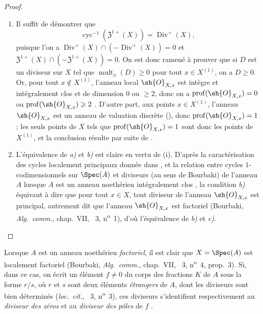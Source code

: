 \begin{proof}
\begin{enumerate}[label=(\roman*)]
  \item Il suffit de démontrer que
\[
\label{IV.21.6.9.1}
  \operatorname{cyc}^{-1}(\mathfrak{Z}^{1+}(X))=\operatorname{Div}^+(X),
  \tag{21.6.9.1}
\]
puisque l'on a $\operatorname{Div}^+(X)\cap(-\operatorname{Div}^+(X))=0$ et $\mathfrak{Z}^{1+}(X)\cap(-\mathfrak{Z}^{1+}(X))=0$.
On est donc ramené à prouver que si $D$ est un diviseur sur $X$ tel que $\operatorname{mult}_x(D)\geq0$ pour tout $x\in X^{(1)}$, on a $D\geq0$.
Or, pour tout $x\notin X^{(1)}$, l'anneau local $\sh{O}_{X,x}$ est intègre et intégralement clos et
de dimension $0$ ou $\geq2$, donc on a $\operatorname{prof}(\sh{O}_{X,x})=0$ ou $\operatorname{prof}(\sh{O}_{X,x})\geq2$ .
D'autre part, aux points $x\in X^{(1)}$, l'anneau $\sh{O}_{X,x}$ est un anneau de valuation discrète (), donc $\operatorname{prof}(\sh{O}_{X,x})=1$ ;
les seuls points de $X$ tels que $\operatorname{prof}(\sh{O}_{X,x})=1$ sont donc les points de $X^{(1)}$, et la conclusion résulte par suite de .

  \item L'équivalence de \emph{a)} et \emph{b)} est claire en vertu de (i).
D'après la caractérisation des cycles localement principaux donnée dans , et la relation entre cycles $1$-codimensionnels sur $\Spec(A)$ et diviseurs (au sens de Bourbaki) de l'anneau $A$ lorsque $A$ est un anneau noethérien intégralement clos , la condition \emph{b)} équivaut à dire que pour tout $x\in X$, tout diviseur de l'anneau $\sh{O}_{X,x}$ est principal, autrement dit que l'anneau $\sh{O}_{X,x}$ est factoriel (Bourbaki, \emph{Alg.\ comm.}, chap.~VII, \textsection~3, n\textsuperscript{o}~1), d'où l'équivalence de \emph{b)} et \emph{c)}.
\end{enumerate}
\end{proof}

\begin{env}[21.6.9.2]
\label{IV.21.6.9.2}
Lorsque $A$ est un anneau noethérien \emph{factoriel}, il est clair que $X=\Spec(A)$ est localement factoriel (Bourbaki, \emph{Alg.\ comm.}, chap.~VII, \textsection~3, n\textsuperscript{o}~4, prop.~3).
Si, dans ce cas, on écrit un élément $f\neq0$ du corps des fractions $K$ de $A$ sous la forme $r/s$, où $r$ et $s$ sont deux éléments \emph{étrangers} de $A$, dont les diviseurs sont bien déterminés (\emph{loc.\ cit.}, \textsection~3, n\textsuperscript{o}~3), ces diviseurs s'identifient respectivement au \emph{diviseur des zéros} et au \emph{diviseur des pôles} de $f$ .
\end{env}

